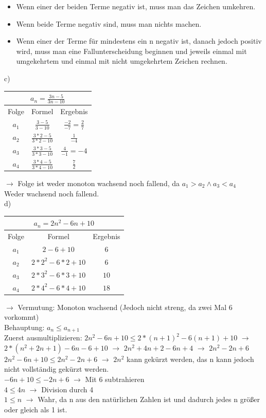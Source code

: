 \documentclass{article}
\begin{document}
	\begin{itemize}
		\item{Wenn einer der beiden Terme negativ ist, muss man das Zeichen umkehren.}
		\item{Wenn beide Terme negativ sind, muss man nichts machen.}
		\item{Wenn einer der Terme für mindestens ein n negativ ist, danach jedoch positiv wird, muss man eine Fallunterscheidung beginnen und jeweils einmal mit umgekehrtem und einmal mit nicht umgekehrtem Zeichen rechnen.}
	\end{itemize}
	c) \\
	\begin{tabular}{| c | c | c |}
		\toprule
		\multicolumn{3}{|c|}{$a_n=\frac{3n-5}{3n-10}$} \\ \hline
		Folge & Formel & Ergebnis \\ \midrule
		$a_1$ & $\frac{3-5}{3-10}$ & $\frac{-2}{-7}=\frac{2}{7}$ \\
		$a_2$ & $\frac{3*2-5}{3*2-10}$ & $\frac{1}{-4}$ \\
		$a_3$ & $\frac{3*3-5}{3*3-10}$ & $\frac{4}{-1}=-4$ \\
		$a_4$ & $\frac{3*4-5}{3*4-10}$ & $\frac{7}{2}$ \\
		\bottomrule
	\end{tabular}
	$\to$ Folge ist weder monoton wachsend noch fallend, da $a_1 > a_2 \land a_3 < a_4$ \\
	Weder wachsend noch fallend. \\
	d) \\
	\begin{tabular}{| c | c | c |}
		\toprule
		\multicolumn{3}{|c|}{$a_n=2n^2-6n+10$} \\ \hline
		Folge & Formel & Ergebnis \\ \midrule
		$a_1$ & $2-6+10$ & $6$ \\
		$a_2$ & $2*2^2-6*2+10$ & $6$ \\
		$a_3$ & $2*3^2-6*3+10$ & $10$ \\
		$a_4$ & $2*4^2-6*4+10$ & $18$ \\
		\bottomrule
	\end{tabular}
	$\to$ Vermutung: Monoton wachsend (Jedoch nicht streng, da zwei Mal 6 vorkommt) \\
	Behauptung: $a_n\leq a_{n+1}$ \\
	Zuerst ausmultiplizieren: $2n^2-6n+10\leq 2*(n+1)^2-6(n+1)+10$ $\to$ $2*(n^2+2n+1)-6n-6+10$ $\to$ $2n^2+4n+2-6n+4$ $\to$ $2n^2-2n+6$ \\
	$2n^2-6n+10\leq 2n^2-2n+6$ $\to$ $2n^2$ kann gekürzt werden, das n kann jedoch nicht vollständig gekürzt werden. \\
	$-6n+10\leq -2n+6$ $\to$ Mit 6 subtrahieren \\
	$4\leq 4n$ $\to$ Division durch 4 \\
	$1\leq n$ $\to$ Wahr, da n aus den natürlichen Zahlen ist und dadurch jedes n größer oder gleich als 1 ist.
\end{document}

